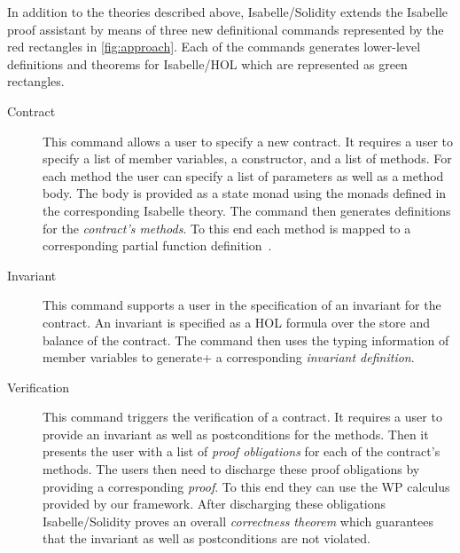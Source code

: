 \documentclass[a4paper,UKenglish,cleveref, autoref, thm-restate]{oasics-v2021}
\begin{document}
In addition to the theories described above, Isabelle/Solidity extends the Isabelle proof assistant by means of three new definitional commands represented by the {\color{red}red rectangles} in \autoref{fig:approach}.
Each of the commands generates lower-level definitions and theorems for Isabelle/HOL which are represented as {\color{green}green rectangles}.
\begin{description}
    \item[Contract]
    This command allows a user to specify a new contract.
    It requires a user to specify a list of member variables, a constructor, and a list of methods.
    For each method the user can specify a list of parameters as well as a method body.
    The body is provided as a state monad using the monads defined in the corresponding Isabelle theory.
    The command then generates definitions for the \emph{contract's methods}.
    To this end each method is mapped to a corresponding partial function definition~\cite{Krauss2010}.
    \item[Invariant]
    This command supports a user in the specification of an invariant for the contract.
    An invariant is specified as a HOL formula over the store and balance of the contract.
    The command then uses the typing information of member variables to generate+ a corresponding \emph{invariant definition}.
    \item[Verification]
    This command triggers the verification of a contract.
    It requires a user to provide an invariant as well as postconditions for the methods.
    Then it presents the user with a list of \emph{proof obligations} for each of the contract's methods.
    The users then need to discharge these proof obligations by providing a corresponding \emph{proof}.
    To this end they can use the WP calculus provided by our framework.
    After discharging these obligations Isabelle/Solidity proves an overall \emph{correctness theorem} which guarantees that the invariant as well as postconditions are not violated.
\end{description}
\end{document}
